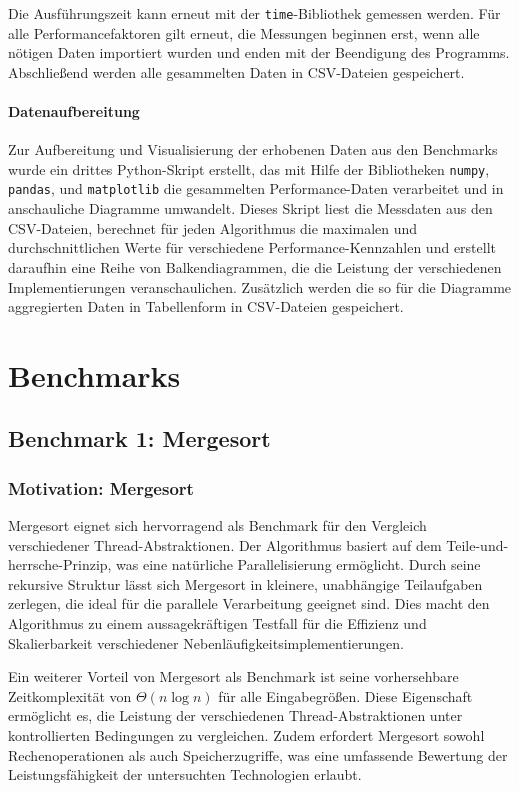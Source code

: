 \documentclass[fontsize=12pt,paper=a4,twoside=semi,parskip=half-,headsepline,headinclude]{scrreprt}
\begin{document}
Die Ausführungszeit kann erneut mit der \texttt{time}-Bibliothek gemessen werden. Für alle Performancefaktoren gilt erneut, die Messungen beginnen erst, wenn alle nötigen Daten importiert wurden und enden mit der Beendigung des Programms. Abschließend werden alle gesammelten Daten in CSV-Dateien gespeichert. 

\subsubsection{Datenaufbereitung}

Zur Aufbereitung und Visualisierung der erhobenen Daten aus den Benchmarks wurde ein drittes Python-Skript erstellt, das mit Hilfe der Bibliotheken \texttt{numpy}, \texttt{pandas}, und \texttt{matplotlib} die gesammelten Performance-Daten verarbeitet und in anschauliche Diagramme umwandelt. Dieses Skript liest die Messdaten aus den CSV-Dateien, berechnet für jeden Algorithmus die maximalen und durchschnittlichen Werte für verschiedene Performance-Kennzahlen und erstellt daraufhin eine Reihe von Balkendiagrammen, die die Leistung der verschiedenen Implementierungen veranschaulichen. Zusätzlich werden die so für die Diagramme aggregierten Daten in Tabellenform in CSV-Dateien gespeichert.

\chapter{Benchmarks}

\section{Benchmark 1: Mergesort}

\subsection{Motivation: Mergesort}
Mergesort eignet sich hervorragend als Benchmark für den Vergleich verschiedener Thread-Abstraktionen. Der Algorithmus basiert auf dem Teile-und-herrsche-Prinzip, was eine natürliche Parallelisierung ermöglicht. Durch seine rekursive Struktur lässt sich Mergesort in kleinere, unabhängige Teilaufgaben zerlegen, die ideal für die parallele Verarbeitung geeignet sind. Dies macht den Algorithmus zu einem aussagekräftigen Testfall für die Effizienz und Skalierbarkeit verschiedener Nebenläufigkeitsimplementierungen.

Ein weiterer Vorteil von Mergesort als Benchmark ist seine vorhersehbare Zeitkomplexität von $\Theta(n\log{}n)$ für alle Eingabegrößen. Diese Eigenschaft ermöglicht es, die Leistung der verschiedenen Thread-Abstraktionen unter kontrollierten Bedingungen zu vergleichen. Zudem erfordert Mergesort sowohl Rechenoperationen als auch Speicherzugriffe, was eine umfassende Bewertung der Leistungsfähigkeit der untersuchten Technologien erlaubt.
\end{document}
